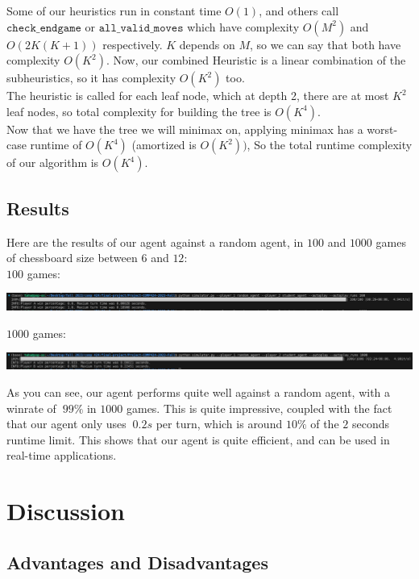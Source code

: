 \documentclass[11pt]{article}
\begin{document}
Some of our heuristics run in constant time $O(1)$, and others call $\texttt{check\_endgame}$ or $\texttt{all\_valid\_moves}$ which have complexity $O(M^2)$ and $O(2K(K+1))$ respectively. $K$ depends on $M$, so we can say that both
have complexity $O(K^2)$. Now, our combined Heuristic is a linear combination of the subheuristics, so it has complexity $O(K^2)$ too.
\\

The heuristic is called for each leaf node, which at depth 2, there are at most $K^2$ leaf nodes, so total complexity for building the tree is $O(K^4)$.
\\

Now that we have the tree we will minimax on, applying minimax has a worst-case runtime of $O(K^4)$ (amortized is $O(K^2))$, So the total runtime complexity of our algorithm is $\boxed{O(K^4)}$.

\subsection{Results}

Here are the results of our agent against a random agent, in $100$ and $1000$ games of chessboard size between $6$ and $12$:
\\

$100$ games:
\begin{center}
\includegraphics*[scale=0.3]{1}
\end{center}

$1000$ games:
\begin{center}
\includegraphics*[scale=0.3]{2}
\end{center}

As you can see, our agent performs quite well against a random agent, with a winrate of $~99\%$ in $1000$ games. This is quite impressive, coupled with the fact that our agent
only uses $~0.2s$ per turn, which is around $10\%$ of the $2$ seconds runtime limit. This shows that our agent is quite efficient, and can be used in real-time applications.
\section{Discussion}

\subsection{Advantages and Disadvantages}
\end{document}
